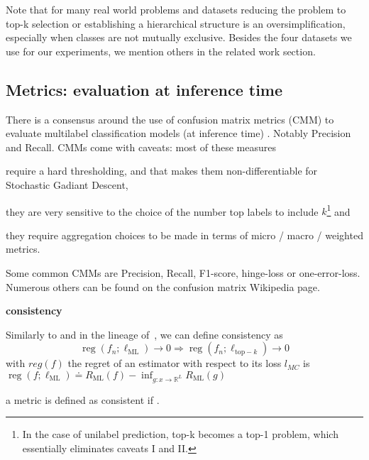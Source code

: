 Note that for many real world problems and datasets reducing the problem to top-k selection or establishing a hierarchical structure is an oversimplification, especially when classes are not mutually exclusive. Besides the four datasets we use for our experiments, we mention others in the related work section.

\subsection{Metrics: evaluation at inference time}
\label{section:background:metrics}

There is a consensus around the use of confusion matrix metrics (CMM) to evaluate multilabel classification models (at inference time) . Notably Precision and Recall. CMMs come with caveats: most of these measures 
\begin{enumerate*}
\item require a hard thresholding, and that makes them non-differentiable for Stochastic Gadiant Descent, 
\item they are very sensitive to the choice of the number top labels to include $k$\footnote{In the case of unilabel prediction, top-k becomes a top-1 problem, which essentially eliminates caveats I and II.} and 
\item they require aggregation choices to be made in terms of micro / macro / weighted metrics.
\end{enumerate*}
Some common CMMs are Precision, Recall, F1-score, hinge-loss or one-error-loss. Numerous others can be found on the confusion matrix Wikipedia page.

\textbf{consistency}

Similarly to \citet{multilabelReduction} and in the lineage of~\citep{consistency-surrogates, consistency-multiclassSVM, consistency-lossAnalysis}, we can define consistency as
%
\begin{equation}
\operatorname{reg}\left(f_{n} ; \ell_{\mathrm{ML}}\right) \rightarrow 0 \Longrightarrow \operatorname{reg}\left(f_{n} ; \ell_{\mathrm{top}-k}\right) \rightarrow 0
\end{equation}
%
with $reg(f)$ the regret of an estimator with respect to its loss $l_{MC}$ is $\operatorname{reg}\left(f ; \ell_{\mathrm{ML}}\right) \doteq R_{\mathrm{ML}}(f)-\inf _{g: x \rightarrow \mathbb{R}^{L}} R_{\mathrm{ML}}(g)$

a metric is defined as consistent if .

